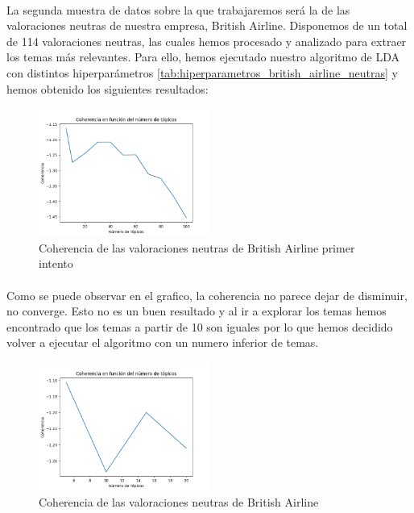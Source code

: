 \documentclass{report}
\begin{document}
                    \paragraph*{}{
                        La segunda muestra de datos sobre la que trabajaremos será la de las valoraciones neutras de nuestra empresa, British Airline.
                        Disponemos de un total de 114 valoraciones neutras, las cuales hemos procesado y analizado para extraer los temas más relevantes.
                        Para ello, hemos ejecutado nuestro algoritmo de LDA con distintos hiperparámetros \ref{tab:hiperparametros_british_airline_neutras} y hemos obtenido los siguientes resultados:
                    }
                    \begin{figure}[H]
                        \centering
                        \includegraphics[width=0.5\textwidth]{./img/british_airline_neutras1.png}
                        \caption{Coherencia de las valoraciones neutras de British Airline primer intento}
                    \end{figure}
                    \paragraph*{}{
                        Como se puede observar en el grafico, la coherencia no parece dejar de disminuir, no converge.
                        Esto no es un buen resultado y al ir a explorar los temas hemos encontrado que los temas a partir de 10 son iguales por lo que hemos decidido volver a ejecutar el algoritmo con un numero inferior de temas.
                    }
                    \begin{figure}[H]
                        \centering
                        \includegraphics[width=0.5\textwidth]{./img/british_airline_neutras2.png}
                        \caption{Coherencia de las valoraciones neutras de British Airline}
                    \end{figure}
\end{document}
